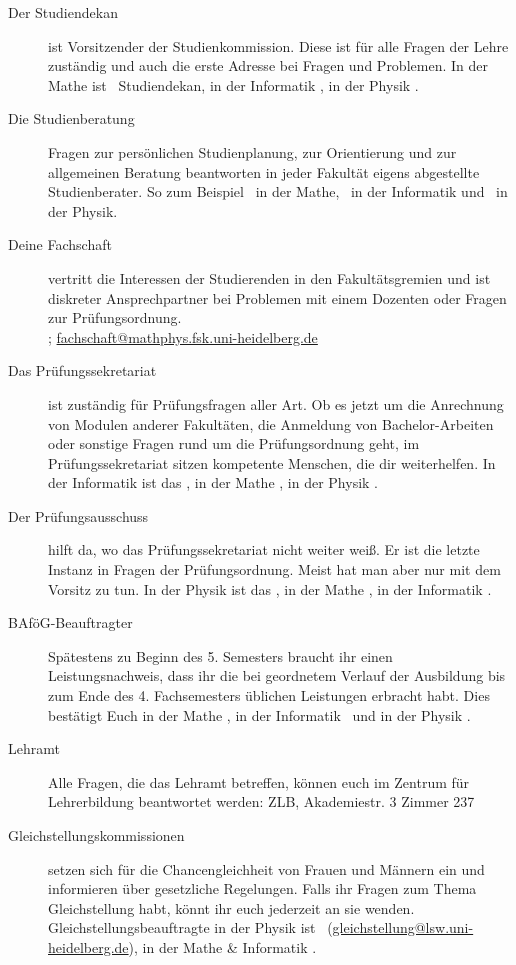\begin{description}
\item[Der Studiendekan] ist Vorsitzender der Studienkommission. Diese ist für alle Fragen der Lehre zuständig und auch die erste Adresse bei Fragen und Problemen. In der Mathe ist \studiendekanmathe\ Studiendekan, in der Informatik \studiendekaninformatik , in der Physik \studiendekanphysik .

\item[Die Studienberatung] Fragen zur persönlichen Studienplanung, zur Orientierung und zur allgemeinen Beratung beantworten in jeder Fakultät eigens abgestellte Studienberater. So zum Beispiel \studienberatungmathe\ in der Mathe, \studienberatunginformatik\ in der Informatik und \studienberatungphysik\ in der Physik.

\item[Deine Fachschaft] vertritt die Interessen der Studierenden in den Fakultätsgremien und ist diskreter Ansprechpartner bei Problemen mit einem Dozenten oder Fragen zur Prüfungsordnung. \\\fsraum; \url{fachschaft@mathphys.fsk.uni-heidelberg.de}

\item[Das Prüfungssekretariat] ist zuständig für Prüfungsfragen aller Art. Ob es jetzt um die Anrechnung von Modulen anderer Fakultäten, die Anmeldung von Bachelor-Arbeiten oder sonstige Fragen rund um die Prüfungsordnung geht, im Prüfungssekretariat sitzen kompetente Menschen, die dir weiterhelfen. In der Informatik ist das \pruefsekinfo, in der Mathe \pruefsekmathe, in der Physik \pruefsekphysik.

\item[Der Prüfungsausschuss] hilft da, wo das Prüfungssekretariat nicht weiter weiß. Er ist die letzte Instanz in Fragen der Prüfungsordnung. Meist hat man aber nur mit dem Vorsitz zu tun. In der Physik ist das \pruefausschussvorsitzphysik, in der Mathe \pruefausschussvorsitzmathe, in der Informatik \pruefausschussvorsitzinformatik.

\item[BAföG-Beauftragter] Spätestens zu Beginn des 5. Semesters braucht ihr einen Leistungsnachweis, dass ihr die bei geordnetem Verlauf der Ausbildung bis zum Ende des 4. Fachsemesters üblichen Leistungen erbracht habt. Dies bestätigt Euch in der Mathe \bafogmathe , in der Informatik \bafoginformatik\ und in der Physik \bafogphysik .

\item[Lehramt] Alle Fragen, die das Lehramt betreffen, können euch im Zentrum für Lehrerbildung beantwortet werden: ZLB, Akademiestr. 3 Zimmer 237

\item[Gleichstellungskommissionen] setzen sich für die Chancengleichheit von Frauen und Männern ein und informieren über gesetzliche Regelungen. Falls ihr Fragen zum Thema Gleichstellung habt, könnt ihr euch jederzeit an sie wenden. Gleichstellungsbeauftragte in der Physik ist \frauenbeauftragtephysik\ (\url{gleichstellung@lsw.uni-heidelberg.de}), in der Mathe \& Informatik \frauenbeauftragtemathe .

\end{description}

